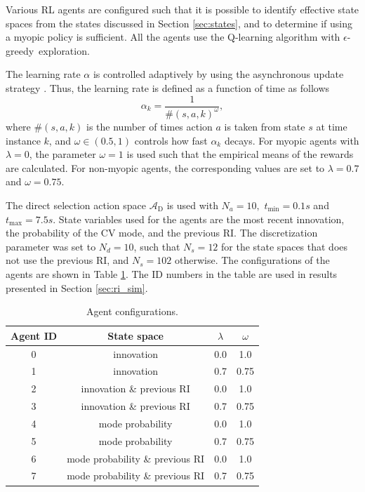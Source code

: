 \documentclass[english, 12pt, a4paper, elec, utf8, a-1b, online]{aaltothesis}
\numberwithin{equation}{section}
\newcommand{\As}{\mathcal{A}}
\newcommand{\egreedy}{$\epsilon$-greedy~}
\newcommand{\tmax}{t_\text{max}}
\newcommand{\tmin}{t_\text{min}}
\newcommand{\Asdir}{\As_\text{D}}
\begin{document}
Various RL agents are configured such that it is possible to identify effective state spaces from the states discussed in Section \ref{sec:states}, and to determine if using a myopic policy is sufficient.
All the agents use the Q-learning algorithm with \egreedy exploration.

The learning rate $\alpha$ is controlled adaptively by using the asynchronous update strategy \cite{Even-Dar2003}.
Thus, the learning rate is defined as a function of time as follows
\begin{equation}
    \alpha_k = \frac{1}{\#(s, a, k)^\omega},
\end{equation}
where $\#(s, a, k)$ is the number of times action $a$ is taken from state $s$ at time instance $k$, and $\omega \in (0.5, 1)$ controls how fast $\alpha_k$ decays.
For myopic agents with $\lambda=0$, the parameter $\omega=1$ is used such that the empirical means of the rewards are calculated.
For non-myopic agents, the corresponding values are set to $\lambda=0.7$ and $\omega=0.75$. 

The direct selection action space $\Asdir$ is used with $N_a=10,$ $\tmin=0.1s$ and $\tmax=7.5s$.
State variables used for the agents are the most recent innovation, the probability of the CV mode, and the previous RI.
The discretization parameter was set to $N_d=10$, such that $N_s=12$ for the state spaces that does not use the previous RI, and $N_s=102$ otherwise.
The configurations of the agents are shown in Table \ref{tab:agent_configurations}. The ID numbers in the table are used in results presented in Section \ref{sec:ri_sim}.

\begin{table}[t]
    \centering
    \begin{tabular}{|c | c | c |c |}
        \hline
        \textbf{Agent ID} & \textbf{State space}  & $\lambda$  &  $\omega$ \\
        \hline
        0 & innovation & 0.0 & 1.0 \\ \hline
        1 & innovation & 0.7 & 0.75 \\ \hline
        2 & innovation \& previous RI &  0.0 & 1.0 \\ \hline
        3 & innovation \& previous RI & 0.7 & 0.75 \\ \hline
        4 & mode probability &  0.0 & 1.0 \\ \hline
        5 & mode probability & 0.7 & 0.75 \\ \hline 
        6 & mode probability \& previous RI &  0.0 & 1.0 \\ \hline 
        7 & mode probability \& previous RI & 0.7 & 0.75 \\
        \hline
    \end{tabular}
    \caption{Agent configurations.}
    \label{tab:agent_configurations}
\end{table}
\end{document}
